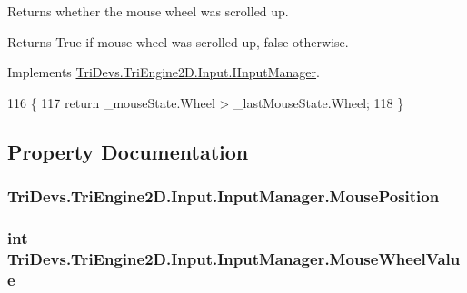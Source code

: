 Returns whether the mouse wheel was scrolled up. 

\begin{DoxyReturn}{Returns}
True if mouse wheel was scrolled up, false otherwise.
\end{DoxyReturn}


Implements \hyperlink{interface_tri_devs_1_1_tri_engine2_d_1_1_input_1_1_i_input_manager_ac4c51409fea3e154c0b8f82cd7b2d930}{Tri\-Devs.\-Tri\-Engine2\-D.\-Input.\-I\-Input\-Manager}.


\begin{DoxyCode}
116         \{
117             \textcolor{keywordflow}{return} \_mouseState.Wheel > \_lastMouseState.Wheel;
118         \}
\end{DoxyCode}


\subsection{Property Documentation}
\hypertarget{class_tri_devs_1_1_tri_engine2_d_1_1_input_1_1_input_manager_aaa0b509eeb71575e3787951bdcd5a963}{
\subsubsection[{Mouse\-Position}]{ Tri\-Devs.\-Tri\-Engine2\-D.\-Input.\-Input\-Manager.\-Mouse\-Position\hspace{0.3cm}{\ttfamily [get]}}}\label{class_tri_devs_1_1_tri_engine2_d_1_1_input_1_1_input_manager_aaa0b509eeb71575e3787951bdcd5a963}
\hypertarget{class_tri_devs_1_1_tri_engine2_d_1_1_input_1_1_input_manager_a398bf5b07143fadc5eb3e5b273f14a23}{
\subsubsection[{Mouse\-Wheel\-Value}]{\setlength{\rightskip}{0pt plus 5cm}int Tri\-Devs.\-Tri\-Engine2\-D.\-Input.\-Input\-Manager.\-Mouse\-Wheel\-Value\hspace{0.3cm}{\ttfamily [get]}}}\label{class_tri_devs_1_1_tri_engine2_d_1_1_input_1_1_input_manager_a398bf5b07143fadc5eb3e5b273f14a23}
